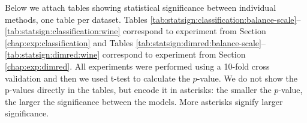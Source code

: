 \documentclass[12pt,a4paper]{report}
\let\openright=\clearpage
\begin{document}



\listoffigures

\listofalgorithmes

\listoftables


\printacronyms[include-classes=abbrev,heading=none] %



 \label{chap:attachments}

Below we attach tables showing statistical significance between individual methods, one table per dataset. Tables \ref{tab:statsign:classification:balance-scale}--\ref{tab:statsign:classification:wine} correspond to experiment from Section \ref{chap:exp:classification} and Tables \ref{tab:statsign:dimred:balance-scale}--\ref{tab:statsign:dimred:wine} correspond to experiment from Section \ref{chap:exp:dimred}. All experiments were performed using a 10-fold cross validation and then we used t-test to calculate the $p$-value. We do not show the p-values directly in the tables, but encode it in asterisks: the smaller the $p$-value, the larger the significance between the models. More asterisks signify larger significance.




\openright
\end{document}
